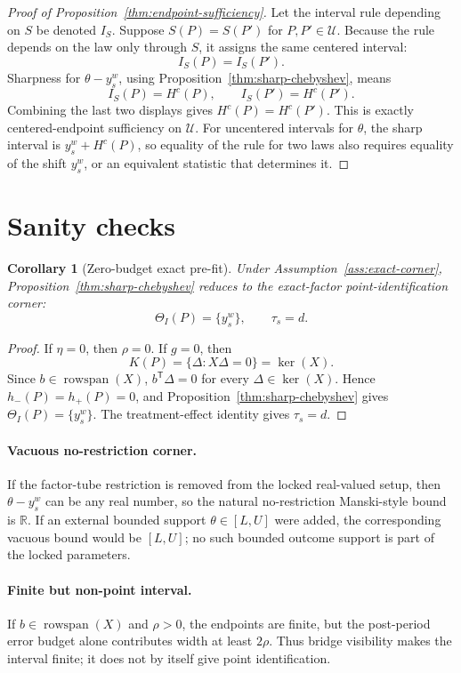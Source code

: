 \documentclass[11pt]{article}
\newcommand{\transpose}{\mathsf{T}}
\newcommand{\R}{\mathbb{R}}
\theoremstyle{definition}
\theoremstyle{plain}
\newtheorem{corollary}{Corollary}
\theoremstyle{remark}
\begin{document}
\begin{proof}[Proof of Proposition~\ref{thm:endpoint-sufficiency}]
Let the interval rule depending on \(S\) be denoted \(I_S\).  Suppose
\(S(P)=S(P')\) for \(P,P'\in\mathcal U\).  Because the rule depends on the law
only through \(S\), it assigns the same centered interval:
\[
I_S(P)=I_S(P').
\]
Sharpness for \(\theta-y_s^w\), using Proposition~\ref{thm:sharp-chebyshev}, means
\[
I_S(P)=H^c(P),\qquad I_S(P')=H^c(P').
\]
Combining the last two displays gives \(H^c(P)=H^c(P')\).  This is exactly
centered-endpoint sufficiency on \(\mathcal U\).  For uncentered intervals for
\(\theta\), the sharp interval is \(y_s^w+H^c(P)\), so equality of the rule for
two laws also requires equality of the shift \(y_s^w\), or an equivalent
statistic that determines it.
\end{proof}

\section{Sanity checks}
\begin{corollary}[Zero-budget exact pre-fit]\label{cor:zero-budget}
Under Assumption~\ref{ass:exact-corner}, Proposition~\ref{thm:sharp-chebyshev}
reduces to the exact-factor point-identification corner:
\[
\Theta_I(P)=\{y_s^w\},\qquad \tau_s=d.
\]
\end{corollary}

\begin{proof}
If \(\eta=0\), then \(\rho=0\).  If \(g=0\), then
\[
K(P)=\{\Delta:X\Delta=0\}=\ker(X).
\]
Since \(b\in\operatorname{rowspan}(X)\), \(b^\transpose\Delta=0\) for every
\(\Delta\in\ker(X)\).  Hence \(h_-(P)=h_+(P)=0\), and
Proposition~\ref{thm:sharp-chebyshev} gives
\(\Theta_I(P)=\{y_s^w\}\).  The treatment-effect identity gives
\(\tau_s=d\).
\end{proof}

\paragraph{Vacuous no-restriction corner.}
If the factor-tube restriction is removed from the locked real-valued setup,
then \(\theta-y_s^w\) can be any real number, so the natural no-restriction
Manski-style bound is \(\R\).  If an external bounded support
\(\theta\in[L,U]\) were added, the corresponding vacuous bound would be
\([L,U]\); no such bounded outcome support is part of the locked parameters.

\paragraph{Finite but non-point interval.}
If \(b\in\operatorname{rowspan}(X)\) and \(\rho>0\), the endpoints are finite,
but the post-period error budget alone contributes width at least \(2\rho\).
Thus bridge visibility makes the interval finite; it does not by itself give
point identification.
\end{document}
